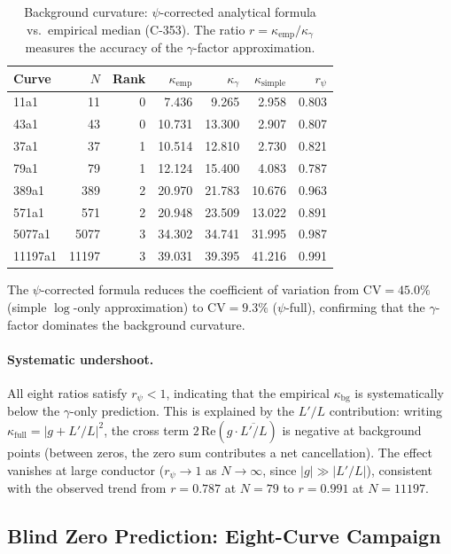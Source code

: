 \documentclass[11pt, a4paper]{article}
\theoremstyle{plain}
\theoremstyle{definition}
\begin{document}
\begin{table}[ht]
\centering
\caption{Background curvature: $\psi$-corrected analytical formula vs.\
  empirical median (C-353).  The ratio $r = \kappa_{\mathrm{emp}}/
  \kappa_{\gamma}$ measures the accuracy of the $\gamma$-factor
  approximation.}
\label{tab:kappabg}
\small
\begin{tabular}{lrrrrrr}
\toprule
Curve & $N$ & Rank & $\kappa_{\mathrm{emp}}$ & $\kappa_{\gamma}$ &
  $\kappa_{\mathrm{simple}}$ & $r_{\psi}$ \\
\midrule
11a1    &    11 & 0 &  7.436 &  9.265 &  2.958 & 0.803 \\
43a1    &    43 & 0 & 10.731 & 13.300 &  2.907 & 0.807 \\
37a1    &    37 & 1 & 10.514 & 12.810 &  2.730 & 0.821 \\
79a1    &    79 & 1 & 12.124 & 15.400 &  4.083 & 0.787 \\
389a1   &   389 & 2 & 20.970 & 21.783 & 10.676 & 0.963 \\
571a1   &   571 & 2 & 20.948 & 23.509 & 13.022 & 0.891 \\
5077a1  &  5077 & 3 & 34.302 & 34.741 & 31.995 & 0.987 \\
11197a1 & 11197 & 3 & 39.031 & 39.395 & 41.216 & 0.991 \\
\bottomrule
\end{tabular}
\end{table}

The $\psi$-corrected formula reduces the coefficient of variation from
$\mathrm{CV}=45.0\%$ (simple $\log$-only approximation) to
$\mathrm{CV}=9.3\%$ ($\psi$-full), confirming that the $\gamma$-factor
dominates the background curvature.

\paragraph{Systematic undershoot.}
All eight ratios satisfy $r_{\psi} < 1$, indicating that the empirical
$\kappa_{\mathrm{bg}}$ is systematically below the $\gamma$-only
prediction.  This is explained by the $L'/L$ contribution: writing
$\kappa_{\mathrm{full}} = |g + L'/L|^{2}$, the cross term
$2\,\mathrm{Re}(g\cdot\overline{L'/L})$ is negative at background
points (between zeros, the zero sum contributes a net cancellation).
The effect vanishes at large conductor
($r_{\psi}\to 1$ as $N\to\infty$, since $|g|\gg|L'/L|$),
consistent with the observed trend from $r=0.787$ at $N=79$ to
$r=0.991$ at $N=11197$.


\subsection{Blind Zero Prediction: Eight-Curve Campaign}
\label{ssec:blind}
\end{document}
